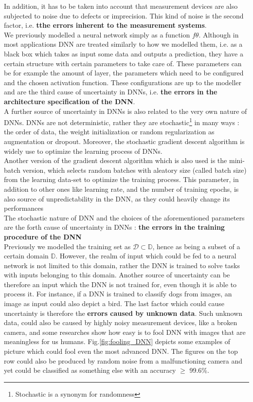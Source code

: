 In addition, it has to be taken into account that measurement devices are also subjected to noise due to defects or imprecision. This kind of noise is the second factor, i.e. \textbf{tthe errors inherent to the measurement systems}. \cite{gawlikowski2021survey}\\
We previously modelled a neural network simply as a function $f\theta$. Although in most applications DNN are treated similarly to how we modelled them, i.e. as a black box which takes as input some data and outputs a prediction, they have a certain structure with certain parameters to take care of. These parameters can be for example the amount of layer, the parameters which need to be configured and the chosen activation function. These configurations are up to the modeller and are the third cause of uncertainty in DNNs, i.e. \textbf{the errors in the architecture specification of the DNN}. \cite{gawlikowski2021survey}\\
A further source of uncertainty in DNNs is also related to the very own nature of DNNs. DNNs are not deterministic, rather they are stochastic\footnote{Stochastic is a synonym for randomness} in many ways : the order of data, the weight initialization or random regularization as augmentation or dropout. \cite{gawlikowski2021survey} Moreover, the stochastic gradient descent algorithm is widely use to optimize the learning process of DNNs. \cite{ruder2017overview}\\
Another version of the gradient descent algorithm which is also used is the mini-batch version, which selects random batches with aleatory size (called batch size) from the learning data-set to optimize the training process. \cite{ruder2017overview} This parameter, in addition to other ones like learning rate, and the number of training epochs, is also source of unpredictability in the DNN, as they could heavily change its performances  \\
The stochastic nature of DNN and the choices of the aforementioned parameters are the forth cause of uncertainty in DNNs : \textbf{the errors in the training procedure of the DNN}\\
Previously we modelled the training set as $\mathcal{D} \subset \mathbb{D}$, hence as being a subset of a certain domain $\mathbb{D}$. However, the realm of input which could be fed to a neural network is not limited to this domain, rather the DNN is trained to solve tasks with inputs belonging to this domain. Another source of uncertainty can be therefore an input which the DNN is not trained for, even though it is able to process it. For instance, if a DNN is trained to classify dogs from images, an image as input could also depict a bird. The last factor which could cause uncertainty is therefore the \textbf{errors caused by unknown data}. Such unknown data, could also be caused by highly noisy measurement devices, like a broken camera, and some researches show how easy is to fool DNN with images that are meaningless for us humans.\cite{nguyen2015deep} Fig.\ref{fig:fooling_DNN} depicts some examples of picture which could fool even the most advanced DNN. The figures on the top row could also be produced by random noise from a malfunctioning camera and yet could be classified as something else with an accuracy $\geq$ 99.6\%. \cite{nguyen2015deep}\\
